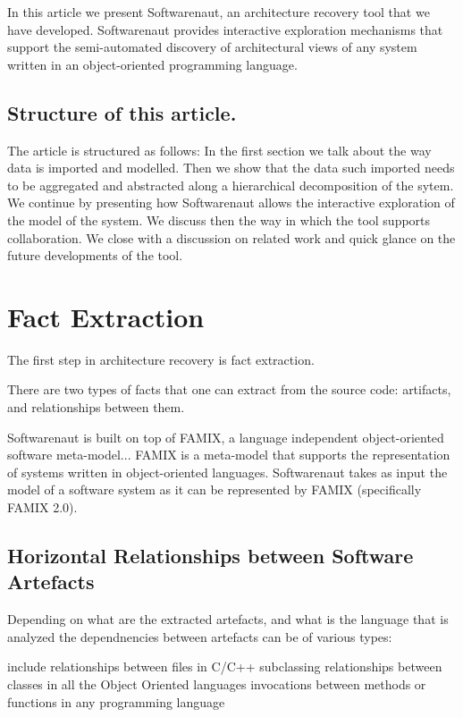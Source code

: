 \documentclass[preprint,12pt]{elsarticle}
\begin{document}
In this article we present Softwarenaut, an architecture recovery tool that we have developed. Softwarenaut provides interactive exploration mechanisms that support the semi-automated discovery of architectural views of any system written in an object-oriented programming language. 

\subsection*{Structure of this article.} The article is structured as follows: In the first section we talk about the way data is imported and modelled. Then we show that the data such imported needs to be aggregated and abstracted along a hierarchical decomposition of the sytem. We continue by presenting how Softwarenaut allows the interactive exploration of the model of the system. We discuss then the way in which the tool supports collaboration. We close with a discussion on related work and  quick glance on the future developments of the tool. 



\section {Fact Extraction}

The first step in architecture recovery is fact extraction. 

There are two types of facts that one can extract from the source code: artifacts, and relationships between them. 

Softwarenaut is built on top of FAMIX, a language independent object-oriented software meta-model...
FAMIX is a meta-model that supports the representation of systems written in object-oriented languages. Softwarenaut takes as input the model of a software system as it can be represented by FAMIX (specifically FAMIX 2.0). 


\subsection {Horizontal Relationships between Software Artefacts}

Depending on what are the extracted artefacts, and what is the language that is analyzed the dependnencies between artefacts can be of various types:

include relationships between files in C/C++
subclassing relationships between classes in all the Object Oriented languages
invocations between methods or functions in any programming language
\end{document}
